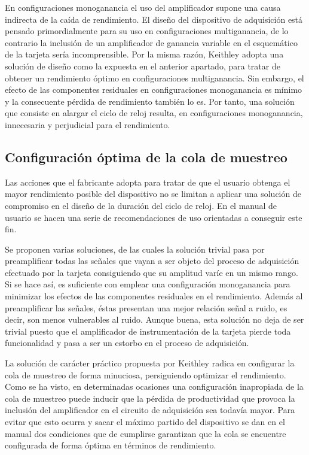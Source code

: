En configuraciones monoganancia el uso del amplificador supone una causa
indirecta de la caída de rendimiento. El diseño del dispositivo de
adquisición está pensado primordialmente para su uso en configuraciones
multiganancia, de lo contrario la inclusión de un amplificador de ganancia
variable en el esquemático de la tarjeta sería incomprensible. Por la misma
razón, Keithley adopta una solución de diseño como la expuesta en el
anterior apartado, para tratar de obtener un rendimiento óptimo en
configuraciones multiganancia. Sin embargo, el efecto de las componentes
residuales en configuraciones monoganancia es mínimo y la consecuente
pérdida de rendimiento también lo es. Por tanto, una solución que consiste
en alargar el ciclo de reloj resulta, en configuraciones monoganancia,
innecesaria y perjudicial para el rendimiento.


\subsection{Configuración óptima de la cola de muestreo}

Las acciones que el fabricante adopta para tratar de que el usuario obtenga
el mayor rendimiento posible del dispositivo no se limitan a aplicar una
solución de compromiso en el diseño de la duración del ciclo de reloj. En
el manual de usuario se hacen una serie de recomendaciones de uso
orientadas a conseguir este fin.

Se proponen varias soluciones, de las cuales la solución trivial pasa por
preamplificar todas las señales que vayan a ser objeto del proceso de
adquisición efectuado por la tarjeta consiguiendo que su amplitud varíe en
un mismo rango. Si se hace así, es suficiente con emplear una configuración
monoganancia para minimizar los efectos de las componentes residuales en el
rendimiento. Además al preamplificar las señales, éstas presentan una mejor
relación señal a ruido, es decir, son menos vulnerables al ruido. Aunque
buena, esta solución no deja de ser trivial puesto que el amplificador de
instrumentación de la tarjeta pierde toda funcionalidad y pasa a ser un
estorbo en el proceso de adquisición.

La solución de carácter práctico propuesta por Keithley radica en
configurar la cola de muestreo de forma minuciosa, persiguiendo optimizar
el rendimiento. Como se ha visto, en determinadas ocasiones una
configuración inapropiada de la cola de muestreo puede inducir que la
pérdida de productividad que provoca la inclusión del amplificador en el
circuito de adquisición sea todavía mayor. Para evitar que esto ocurra y
sacar el máximo partido del dispositivo se dan en el manual dos condiciones
que de cumplirse garantizan que la cola se encuentre configurada de forma
óptima en términos de rendimiento.


